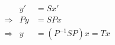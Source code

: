 \begin{align} & & y' &= S x' \\[1.6ex] &\Rightarrow & P y &= S P x \\[1.6ex] &\Rightarrow & y &= \left(P^{-1} S P\right) x = T x \end{align}
